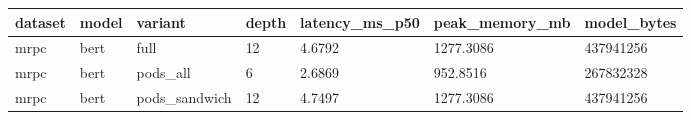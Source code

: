 \begin{tabular}{lllllll}
\hline
dataset & model & variant & depth & latency\_ms\_p50 & peak\_memory\_mb & model\_bytes \\
\hline
mrpc & bert & full & 12 & 4.6792 & 1277.3086 & 437941256 \\
mrpc & bert & pods\_all & 6 & 2.6869 & 952.8516 & 267832328 \\
mrpc & bert & pods\_sandwich & 12 & 4.7497 & 1277.3086 & 437941256 \\
\hline
\end{tabular}
